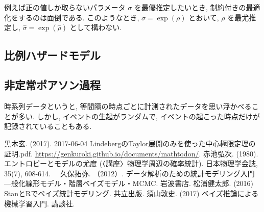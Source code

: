 \documentclass[a4paper, 12pt]{jarticle}
\begin{document}
例えば正の値しか取らないパラメータ $\sigma$ を最優推定したいとき, 制約付きの最適化をするのは面倒である. このようなとき, $\sigma=\exp(\rho)$ とおいて, $\rho$ を最尤推定し, $\hat \sigma =\exp(\hat \rho)$ として構わない. 

\subsection{比例ハザードモデル}

\subsection{非定常ポアソン過程}
時系列データというと, 等間隔の時点ごとに計測されたデータを思い浮かべることが多い. しかし, イベントの生起がランダムで, イベントの起こった時点だけが記録されていることもある. 

\begin{thebibliography}{4}
黒木玄. (2017). 2017-06-04 LindebergのTaylor展開のみを使った中心極限定理の証明.pdf. \url{https://genkuroki.github.io/documents/mathtodon/}.
 赤池弘次. (1980). エントロピーとモデルの尤度 (〈講座〉物理学周辺の確率統計). 日本物理学会誌, 35(7), 608-614.
　久保拓弥. （2012）. データ解析のための統計モデリング入門---般化線形モデル・階層ベイズモデル・MCMC. 岩波書店.
 松浦健太郎. (2016) StanとRでベイズ統計モデリング. 共立出版.
 須山敦史. (2017) ベイズ推論による機械学習入門. 講談社.
\end{thebibliography}
\end{document}
